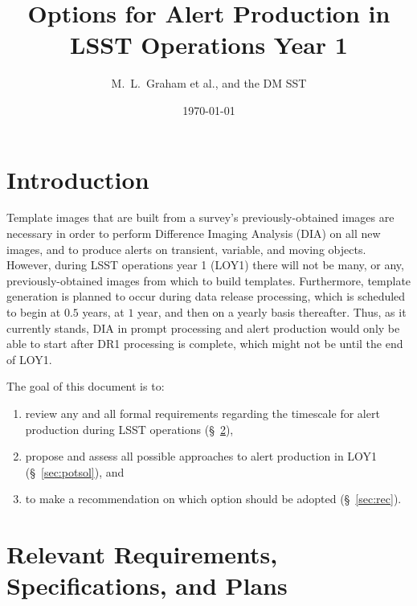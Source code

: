 \documentclass[DM,lsstdraft,toc]{lsstdoc}
\title[Alert Production in Year 1]{Options for Alert Production in \\ LSST Operations Year 1}
\author{M.~L.~Graham et al., and the DM SST}
\date{\today}
\begin{document}
\maketitle


\section{Introduction} \label{sec:intro}

Template images that are built from a survey's previously-obtained images are necessary in order to perform Difference Imaging Analysis (DIA) on all new images, and to produce alerts on transient, variable, and moving objects. However, during LSST operations year 1 (LOY1) there will not be many, or any, previously-obtained images from which to build templates. Furthermore, template generation is planned to occur during data release processing, which is scheduled to begin at $0.5$ years, at $1$ year, and then on a yearly basis thereafter. Thus, as it currently stands, DIA in prompt processing and alert production would only be able to start after DR1 processing is complete, which might not be until the end of LOY1.

The goal of this document is to:
\begin{enumerate}
\item review any and all formal requirements regarding the timescale for alert production during LSST operations (\S~\ref{sec:req}), 
\item propose and assess all possible approaches to alert production in LOY1 (\S~\ref{sec:potsol}), and 
\item to make a recommendation on which option should be adopted (\S~\ref{sec:rec}).
\end{enumerate}


\section{Relevant Requirements, Specifications, and Plans}\label{sec:req}
\end{document}
